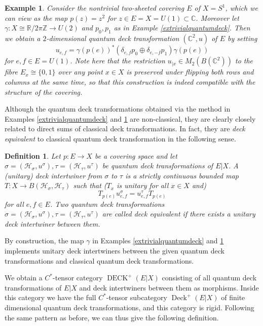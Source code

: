 \documentclass[a4paper]{amsart}
\newcommand*{\Hc}{\mathcal{H}}
\DeclareMathOperator{\Deck}{Deck}
\DeclareMathOperator{\DECK}{DECK}
\numberwithin{equation}{section}
\theoremstyle{change}
\newtheorem{definition}[theorem]{Definition}
\newtheorem{example}[theorem]{Example}
\begin{document}
\begin{example} \label{twosheeted}
Consider the nontrivial two-sheeted covering $ E $ of $ X = S^1 $, which we can view as the map $ p(z) = z^2 $ for $ z \in E = X = U(1) \subset \mathbb{C} $. 
Moreover let $ \gamma: X \cong \mathbb{R}/2 \pi \mathbb{Z} \rightarrow U(2) $ and $ p_0, p_1 $ as in Example \ref{extrivialquantumdeck}. 
Then we obtain a $ 2 $-dimensional quantum deck transformation $ (\mathbb{C}^2, u) $ of $ E $ by setting
$$
u_{e,f} = \gamma(p(e))^* (\delta_{e,f} p_0 \oplus \delta_{e, -f} p_1) \gamma(p(e))
$$
for $ e, f \in E = U(1) $. 
Note here that the restriction $ u_{|x} \in M_2(B(\mathbb{C}^2)) $ to the fibre $ E_x \cong \{0,1\} $ over any point $ x \in X $ is preserved under flipping both rows and columns at the same time, so that this construction is indeed compatible with the structure of the covering. 
\end{example} 

Although the quantum deck transformations obtained via the method in Examples \ref{extrivialquantumdeck} and \ref{twosheeted} are non-classical, they are clearly closely related to direct sums of classical deck transformations. 
In fact, they are \emph{deck equivalent} to classical quantum deck transformation in the following sense. 

\begin{definition} 
Let $ p: E \rightarrow X $ be a covering space and let $ \sigma = (\Hc_\sigma, u^\sigma), \tau = (\Hc_\tau, u^\tau) $ be quantum deck transformations of $ E|X $. 
A (unitary) deck intertwiner from $ \sigma $ to $ \tau $ is a strictly continuous bounded map $ T: X \rightarrow B(\Hc_\sigma, \Hc_\tau) $ such that ($ T_x $ is unitary for all $ x \in X $ and)
$$
T_{p(e)} u^\sigma_{e,f} = u^\tau_{e,f} T_{p(e)} 
$$
for all $ e, f \in E $. 
Two quantum deck transformations $ \sigma = (\Hc_\sigma, u^\sigma), \tau = (\Hc_\tau, u^\tau) $ 
are called deck equivalent if there exists a unitary deck intertwiner between them.  
\end{definition} 

By construction, the map $ \gamma $ in Examples \ref{extrivialquantumdeck} and \ref{twosheeted} implements unitary deck intertwiners between the given quantum deck transformations and classical quantum deck transformations. 

We obtain a $ C^* $-tensor category $ \DECK^+(E|X) $ consisting of all quantum deck transformations of $ E|X $ and deck intertwiners between them as morphisms. 
Inside this category we have the full $ C^* $-tensor subcategory $ \Deck^+(E|X) $ of finite dimensional quantum deck transformations, and this category is rigid. Following the same pattern as before, we can thus give the following definition. 
\end{document}
